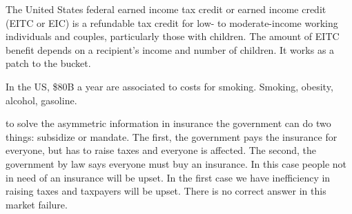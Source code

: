 The United States federal earned income tax credit or earned income credit (EITC or EIC) is a refundable tax credit for low- to moderate-income working individuals and couples, particularly those with children. The amount of EITC benefit depends on a recipient's income and number of children. It works as a patch to the bucket.

In the US, \$80B a year are associated to costs for smoking. Smoking, obesity, alcohol, gasoline.

to solve the asymmetric information in insurance the government can do two things: subsidize or mandate. The first, the government pays the insurance for everyone, but has to raise taxes and everyone is affected. The second, the government by law says everyone must buy an insurance. In this case people not in need of an insurance will be upset. In the first case we have inefficiency in raising taxes and taxpayers will be upset. There is no correct answer in this market failure.